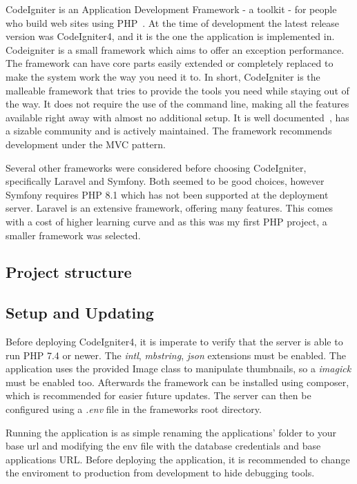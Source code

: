 \documentclass[
  digital,     %
  oneside,     %
  nosansbold,  %
  colorbold, %
  lof,         %
  lot,         %
]{fithesis4}
\begin{document}
CodeIgniter is an Application Development Framework - a toolkit - for people who build web sites using PHP~\cite{codeigniter}. At the time of development the latest release version was CodeIgniter4, and it is the one the application is implemented in. Codeigniter is a small framework which aims to offer an exception performance. The framework can have core parts easily extended or completely replaced to make the system work the way you need it to. In short, CodeIgniter is the malleable framework that tries to provide the tools you need while staying out of the way. It does not require the use of the command line, making all the features available right away with almost no additional setup. It is well documented~\cite{codeigniter4}, has a sizable community and is actively maintained. The framework recommends development under the MVC pattern.

Several other frameworks were considered before choosing CodeIgniter, specifically Laravel and Symfony. Both seemed to be good choices, however Symfony requires PHP 8.1 which has not been supported at the deployment server. Laravel is an extensive framework, offering many features. This comes with a cost of higher learning curve and as this was my first PHP project, a smaller framework was selected.

\subsection{Project structure}

\subsection{Setup and Updating}

Before deploying CodeIgniter4, it is imperate to verify that the server is able to run PHP 7.4 or newer.  The \textit{intl}, \textit{mbstring}, \textit{json} extensions must be enabled. The application uses the provided Image class to manipulate thumbnails, so a \textit{imagick} must be enabled too. Afterwards the framework can be installed using composer, which is recommended for easier future updates. The server can then be configured using a \textit{.env} file in the frameworks root directory.

Running the application is as simple renaming the applications' folder to your base url and modifying the env file with the database credentials and base applications URL. Before deploying the application, it is recommended to change the enviroment to production from development to hide debugging tools.
\end{document}
